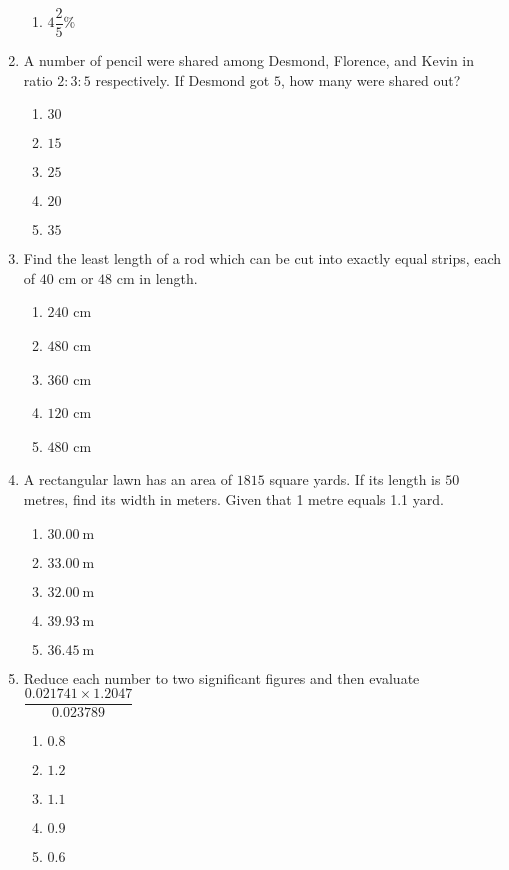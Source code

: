 \begin{multicols}{2}
\begin{enumerate}[label={\arabic*.}]
\begin{enumerate}[label={\Alph*.}]
    \item \(4\dfrac{2}{5}\%\)
    \end{enumerate}
\item A number of pencil were shared among Desmond, Florence, and Kevin in ratio \(2:3:5\) respectively. If Desmond got \(5\), how many were shared out?
    \begin{enumerate}[label={\Alph*.}]
    \item \(30\)
    \item \(15\)
    \item \(25\)
    \item \(20\)
    \item \(35\)
    \end{enumerate}
\item Find the least length of a rod which can be cut into exactly equal strips, each of \(40\) cm or \(48\) cm in length.
    \begin{enumerate}[label={\Alph*.}]
    \item \(240 \) cm
    \item \(480\) cm
    \item \(360\) cm
    \item \(120\) cm
    \item \(480\) cm
    \end{enumerate}
\item A rectangular lawn has an area of \(1815\) square yards. If its length is \(50\) metres, find its width in meters. Given that 1 metre equals 1.1 yard.
    \begin{enumerate}[label={\Alph*.}]
    \item \(\SI{30.00}{\meter}\)
    \item \(\SI{33.00}{\meter}\)
    \item \(\SI{32.00}{\meter}\)
    \item \(\SI{39.93}{\meter}\)
    \item \(\SI{36.45}{\meter}\)
    \end{enumerate}
\item Reduce each number to two significant figures and then evaluate \(\dfrac{0.021741 \times 1.2047}{0.023789}\)
    \begin{enumerate}[label={\Alph*.}]
    \item \(0.8\)
    \item \(1.2\)
    \item \(1.1\)
    \item \(0.9\)
    \item \(0.6\)
    \end{enumerate}

\end{enumerate}
\end{multicols}
